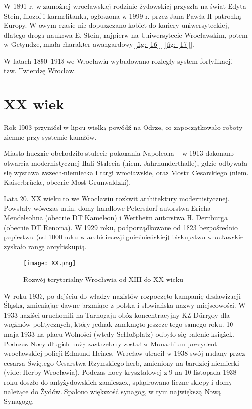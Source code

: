 \documentclass{article}
\begin{document}
W 1891 r. w zamożnej wrocławskiej rodzinie żydowskiej przyszła na świat Edyta Stein, filozof i karmelitanka, ogłoszona w 1999 r. przez Jana Pawła II patronką Europy. W owym czasie nie dopuszczano kobiet do kariery uniwersyteckiej, dlatego droga naukowa E. Stein, najpierw na Uniwersytecie Wrocławskim, potem w Getyndze, miała charakter awangardowy[\ref{fig: [16]}][\ref{fig: [17]}].

W latach 1890–1918 we Wrocławiu wybudowano rozległy system fortyfikacji – tzw. Twierdzę Wrocław.
\newpage
\section {XX wiek}

Rok 1903 przyniósł w lipcu wielką powódź na Odrze, co zapoczątkowało roboty ziemne przy systemie kanałów.

Miasto hucznie obchodziło stulecie pokonania Napoleona – w 1913 dokonano otwarcia modernistycznej Hali Stulecia (niem. Jahrhunderthalle), gdzie odbywała się wystawa wszech-niemiecka i targi wrocławskie, oraz Mostu Cesarskiego (niem. Kaiserbrücke, obecnie Most Grunwaldzki).

Lata 20. XX wieku to we Wrocławiu rozkwit architektury modernistycznej. Powstały wówczas m.in. domy handlowe Petersdorf autorstwa Ericha Mendelsohna (obecnie DT Kameleon) i Wertheim autorstwa H. Dernburga (obecnie DT Renoma). W 1929 roku, podporządkowane od 1823 bezpośrednio papiestwu (od 1000 roku w archidiecezji gnieźnieńskiej) biskupstwo wrocławskie zyskało rangę arcybiskupią.

\begin{center}
\begin{figure}[h]
	\centering
	\texttt{[image: XX.png]}
	\caption{Rozwój terytorialny Wrocławia od XIII do XX wieku}
\end{figure}
\end{center}

W roku 1933, po dojściu do władzy nazistów rozpoczęto kampanię deslawizacji Śląska, zmieniając dawne brzmiące z polska i słowiańska nazwy miejscowości. W 1933 naziści uruchomili na Tarnogaju obóz koncentracyjny KZ Dürrgoy dla więźniów politycznych, który jednak zamknięto jeszcze tego samego roku. 10 maja 1933 na placu Wolności (wtedy Schloßplatz) odbyło się palenie książek. Podczas Nocy długich noży zastrzelony został w Monachium prezydent wrocławskiej policji Edmund Heines. Wrocław utracił w 1938 swój nadany przez cesarza Świętego Cesarstwa Rzymskiego herb, zmieniony na bardziej niemiecki (vide: Herby Wrocławia). Podczas nocy kryształowej z 9 na 10 listopada 1938 roku doszło do antyżydowskich zamieszek, splądrowano liczne sklepy i domy należące do Żydów. Spalono większość synagog, w tym największą Nową Synagogę.
\end{document}
